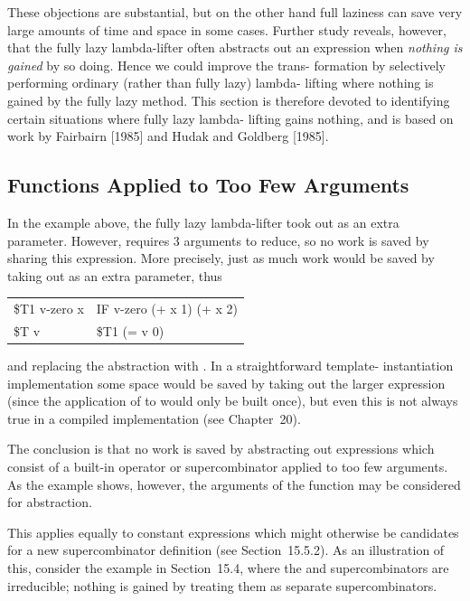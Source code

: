 \noindent
These objections are substantial, but on the other hand full laziness can save
very large amounts of time and space in some cases. Further study reveals,
however, that the fully lazy lambda-lifter often abstracts out an expression
when \textit{nothing is gained} by so doing. Hence we could improve the trans-
formation by selectively performing ordinary (rather than fully lazy) lambda-
lifting where nothing is gained by the fully lazy method. This section is
therefore devoted to identifying certain situations where fully lazy lambda-
lifting gains nothing, and is based on work by Fairbairn [1985] and Hudak and
Goldberg [1985].

\subsection{Functions Applied to Too Few Arguments}

In the example above, the fully lazy lambda-lifter took out  as an
extra parameter. However,  requires 3 arguments to reduce, so no work is
saved by sharing this expression. More precisely, just as much work would be
saved by taking out  as an extra parameter, thus

\begin{mlcoded}
\begin{tabular}{@{}l@{$\;=\;$}l}
    \$T1 v-zero x & IF v-zero (+ x 1) (+ x 2) \\
    \$T v         & \$T1 (= v 0) \\
\end{tabular}
\end{mlcoded}

\noindent
and replacing the  abstraction with . In a straightforward template-
instantiation implementation some space would be saved by taking out the
larger expression (since the application of  to  would only be built
once), but even this is not always true in a compiled implementation (see
Chapter~20).

The conclusion is that no work is saved by abstracting out expressions which
consist of a built-in operator or supercombinator applied to too few
arguments. As the example shows, however, the arguments of the function
may be considered for abstraction.

This applies equally to constant expressions which might otherwise be
candidates for a new supercombinator definition (see Section~15.5.2). As an
illustration of this, consider the example in Section~15.4, where the 
and  supercombinators are irreducible; nothing is gained by treating
them as separate supercombinators.

